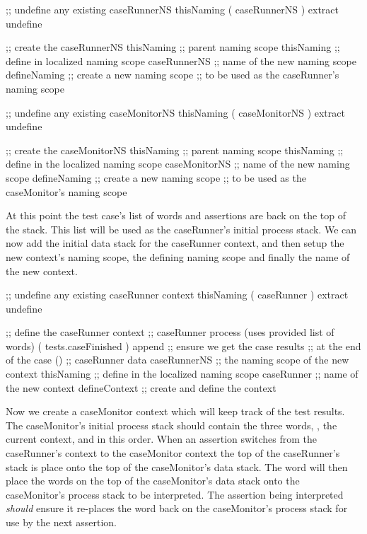 \startJoylolCode
    ;; undefine any existing caseRunnerNS
    thisNaming
    ( caseRunnerNS ) extract
    undefine

    ;; create the caseRunnerNS
    thisNaming   ;; parent naming scope
    thisNaming   ;; define in localized naming scope
    caseRunnerNS ;; name of the new naming scope
    defineNaming ;; create a new naming scope
                 ;; to be used as the caseRunner's naming scope
\stopJoylolCode

\startJoylolCode
    ;; undefine any existing caseMonitorNS
    thisNaming
    ( caseMonitorNS ) extract
    undefine

    ;; create the caseMonitorNS
    thisNaming    ;; parent naming scope
    thisNaming    ;; define in the localized naming scope
    caseMonitorNS ;; name of the new naming scope
    defineNaming  ;; create a new naming scope
                  ;; to be used as the caseMonitor's naming scope
\stopJoylolCode

At this point the test case's list of words and assertions are back on the 
top of the stack. This list will be used as the caseRunner's initial 
process stack. We can now add the initial data stack for the caseRunner 
context, and then setup the new context's naming scope, the defining 
naming scope and finally the name of the new context.

\startJoylolCode
    ;; undefine any existing caseRunner context
    thisNaming
    ( caseRunner ) extract
    undefine

    ;; define the caseRunner context
                  ;; caseRunner process (uses provided list of words)
    ( tests.caseFinished )
    append        ;; ensure we get the case results
                  ;; at the end of the case
    ()            ;; caseRunner data
    caseRunnerNS  ;; the naming scope of the new context
    thisNaming    ;; define in the localized naming scope
    caseRunner    ;; name of the new context
    defineContext ;; create and define the context
\stopJoylolCode

Now we create a caseMonitor context which will keep track of the test 
results. The caseMonitor's initial process stack should contain the three 
words, , the current context, and  in this 
order. When an assertion switches from the caseRunner's context to the 
caseMonitor context the top of the caseRunner's stack is place onto the 
top of the caseMonitor's data stack. The  word will then 
place the words on the top of the caseMonitor's data stack onto the 
caseMonitor's process stack to be interpreted. The assertion being 
interpreted \emph{should} ensure it re-places the  word 
back on the caseMonitor's process stack for use by the next assertion. 

